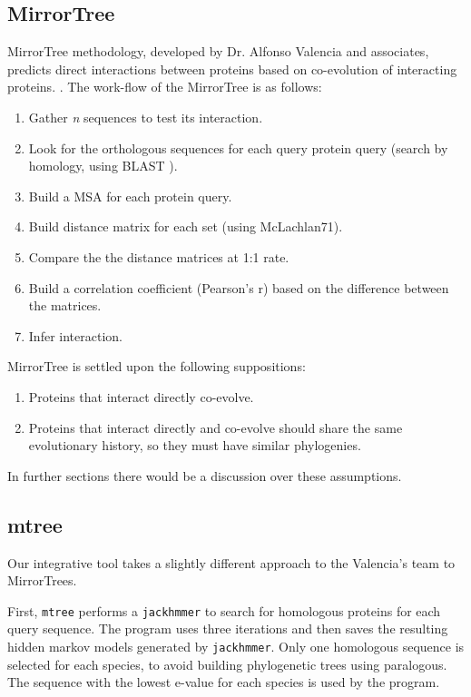 \documentclass[11pt]{article}
\begin{document}
\subsection{MirrorTree}
MirrorTree methodology, developed by Dr. Alfonso Valencia and associates, predicts direct interactions between proteins based on co-evolution of interacting proteins. \cite{Pazos2001}. The work-flow of the MirrorTree is as follows:
\begin{enumerate}
\setlength{\itemsep}{1pt}
	\item Gather \textit{n} sequences to test its interaction.
	\item Look for the orthologous sequences for each query protein query (search by homology, using BLAST \cite{BLAST}).
	\item Build a MSA for each protein query.
	\item Build distance matrix for each set (using McLachlan71).
	\item Compare the the distance matrices at 1:1 rate.
	\item Build a correlation coefficient (Pearson's r) based on the difference between the matrices.
	\item Infer interaction.
\end{enumerate}
MirrorTree is settled upon the following suppositions:
\begin{enumerate}
\setlength{\itemsep}{1pt}
	\item Proteins that interact directly co-evolve.
	\item Proteins that interact directly and co-evolve should share the same evolutionary history, so they must have similar phylogenies.
\end{enumerate}
In further sections there would be a discussion over these assumptions.

\subsection{mtree}

Our integrative tool takes a slightly different approach to the Valencia's team to MirrorTrees. 

First, \texttt{mtree} performs a \texttt{jackhmmer} to search for homologous proteins for each query sequence. The program uses three iterations and then saves the resulting hidden markov models generated by \texttt{jackhmmer}. Only one homologous sequence is selected for each species, to avoid building phylogenetic trees using paralogous. The sequence with the lowest e-value for each species is used by the program.
\end{document}
